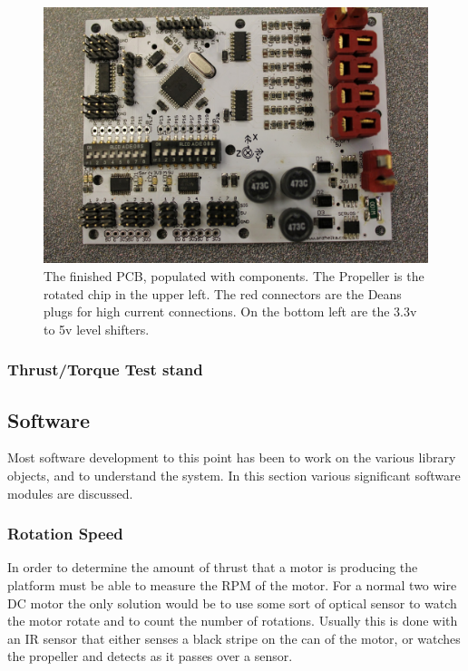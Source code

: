 \documentclass{article}
\numberwithin{equation}{section} %
\begin{document}
\begin{figure}[h!]
  \centering
	\includegraphics[scale=.2]{populated_pcb_revA.JPG}
  \caption{The finished PCB, populated with components. The Propeller is the rotated chip in the upper left. The red connectors are the Deans plugs for high current connections. On the bottom left are the 3.3v to 5v level shifters.}
\end{figure}  


\subsubsection{Thrust/Torque Test stand}

\subsection{Software}
Most software development to this point has been to work on the various library objects, and to understand the system. In this section various significant software modules are discussed.
\subsubsection{Rotation Speed}
In order to determine the amount of thrust that a motor is producing the platform must be able to measure the RPM of the motor. For a normal two wire DC motor the only solution would be to use some sort of optical sensor to watch the motor rotate and to count the number of rotations. Usually this is done with an IR sensor that either senses a black stripe on the can of the motor, or watches the propeller and detects as it passes over a sensor. 
\end{document}
